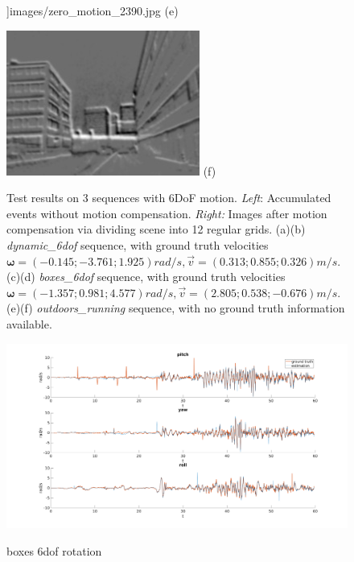 \begin{figure}
\begin{minipage}[t]{0.48\textwidth}
    \textwidth]{images/zero_motion_2390.jpg} (e)
  \end{minipage}
  \hfill
  \begin{minipage}[t]{0.48\textwidth}
    \centering \includegraphics[width =
    \textwidth]{images/optimized_2390.jpg} (f)
  \end{minipage}
  \hfill
  \caption{Test results on 3 sequences with 6DoF
    motion. \textit{Left}: Accumulated events without motion
    compensation. \textit{Right:} Images after motion compensation via
    dividing scene into 12 regular grids. (a)(b)
    \textit{dynamic\_6dof} sequence, with ground truth velocities
    $\bm{\omega}=(-0.145;-3.761;1.925) rad/s,
    \vec{v}=(0.313;0.855;0.326) m/s$. (c)(d) \textit{boxes\_6dof}
    sequence, with ground truth velocities
    $\bm{\omega}=(-1.357;0.981;4.577) rad/s,
    \vec{v}=(2.805;0.538;-0.676) m/s$. (e)(f)
    \textit{outdoors\_running} sequence, with no ground truth
    information available.}
  \label{fig:patches_compr}
\end{figure}

\begin{figure}
\centering \includegraphics[width =
\textwidth]{images/boxes_6dof_rotation.png}
\label{fig:boxes_6dof_rotation}
\caption{boxes 6dof rotation}
\end{figure}

